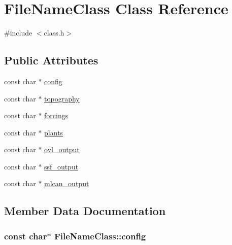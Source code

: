 \hypertarget{class_file_name_class}{}\section{File\+Name\+Class Class Reference}
\label{class_file_name_class}


{\ttfamily \#include $<$class.\+h$>$}

\subsection*{Public Attributes}
\begin{DoxyCompactItemize}
\item 
const char $\ast$ \hyperlink{class_file_name_class_a56a0b62c4ee35aeea73f55760e515f64}{config}
\item 
const char $\ast$ \hyperlink{class_file_name_class_a46e7b694eeb7e8f02bc5d3ad68ef2d9c}{topography}
\item 
const char $\ast$ \hyperlink{class_file_name_class_ad66b890d863ed3f05110c68ce81fb0f5}{forcings}
\item 
const char $\ast$ \hyperlink{class_file_name_class_ad260b37a699c1970350166bb30a28659}{plants}
\item 
const char $\ast$ \hyperlink{class_file_name_class_ade1df69428c2d7c0bbebd58c69df479a}{ovl\+\_\+output}
\item 
const char $\ast$ \hyperlink{class_file_name_class_ae874edca0947f72ddf8b2f85eb104fcd}{ssf\+\_\+output}
\item 
const char $\ast$ \hyperlink{class_file_name_class_a7c3cece684060981031e15dd2b6735dc}{mlcan\+\_\+output}
\end{DoxyCompactItemize}


\subsection{Member Data Documentation}
\subsubsection[{\texorpdfstring{config}{config}}]{\setlength{\rightskip}{0pt plus 5cm}const char$\ast$ File\+Name\+Class\+::config}\hypertarget{class_file_name_class_a56a0b62c4ee35aeea73f55760e515f64}{}\label{class_file_name_class_a56a0b62c4ee35aeea73f55760e515f64}
